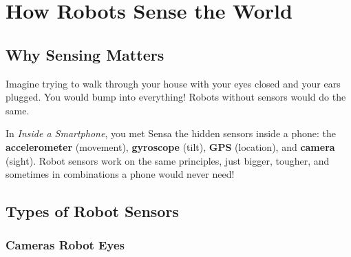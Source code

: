 
\chapter{How Robots Sense the World}


\section*{Why Sensing Matters}

Imagine trying to walk through your house with your eyes closed and your
ears plugged. You would bump into everything! Robots without sensors would
do the same.


\begin{tcolorbox}[enhanced,colback=SunYellow!12,colframe=SunYellow!70!black,arc=6pt,boxrule=1pt,
  fonttitle=\bfseries, title={\faRetweet\quad Remember from Book 2?}]
  In \emph{Inside a Smartphone}, you met Sensa \textemdash{} the hidden sensors inside a phone:
  the \textbf{accelerometer} (movement), \textbf{gyroscope} (tilt), \textbf{GPS} (location),
  and \textbf{camera} (sight). Robot sensors work on the same principles, just bigger, tougher,
  and sometimes in combinations a phone would never need!
\end{tcolorbox}

\sectionrule

\section*{Types of Robot Sensors}

\subsection*{Cameras \textemdash{} Robot Eyes}

